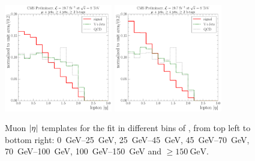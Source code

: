 \begin{figure}[!htbp]
  	\hspace*{\fill} \\
  	\hspace*{\fill}
  	{\includegraphics[width=0.42\textwidth]{measurement/MET/central/fit_templates/muon_templates_bin_100-150}}\hfill
  	{\includegraphics[width=0.42\textwidth]{measurement/MET/central/fit_templates/muon_templates_bin_150-inf}}
  	\hspace*{\fill}
    \caption[Muon $\abs \eta$ templates for the fit in different bins of \MET]{Muon $\abs \eta$ templates for the fit in
    different bins of \MET, from top left to bottom right: \SIrange{0}{25}{\GeV}, \SIrange{25}{45}{\GeV},
    \SIrange{45}{70}{\GeV}, \SIrange{70}{100}{\GeV}, \SIrange{100}{150}{\GeV} and $\geq \SI{150}{\GeV}$.}
    \label{fig:fit_templates_MET_muon}
\end{figure}


